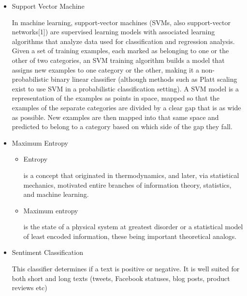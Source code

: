 \documentclass[oneside,a4paper,12pt]{book}
\begin{document}
\begin{itemize}
    \item Support Vector Machine
    \par In machine learning, support-vector machines (SVMs, also support-vector networks[1]) are supervised learning models with associated learning algorithms that analyze data used for classification and regression analysis. Given a set of training examples, each marked as belonging to one or the other of two categories, an SVM training algorithm builds a model that assigns new examples to one category or the other, making it a non-probabilistic binary linear classifier (although methods such as Platt scaling exist to use SVM in a probabilistic classification setting). A SVM model is a representation of the examples as points in space, mapped so that the examples of the separate categories are divided by a clear gap that is as wide as possible. New examples are then mapped into that same space and predicted to belong to a category based on which side of the gap they fall.
    \item Maximum Entropy
    \begin{itemize}
        \item Entropy 
        \par is a concept that originated in thermodynamics, and later, via statistical mechanics, motivated entire branches of information theory, statistics, and machine learning.
        \item Maximum entropy
        \par is the state of a physical system at greatest disorder or a statistical model of least encoded information, these being important theoretical analogs.
    \end{itemize}
    \item Sentiment Classification
    \par This classifier determines if a text is positive or negative. It is well suited for both short and long texts (tweets, Facebook statuses, blog posts, product reviews etc)
\end{itemize}
\newpage
\end{document}
